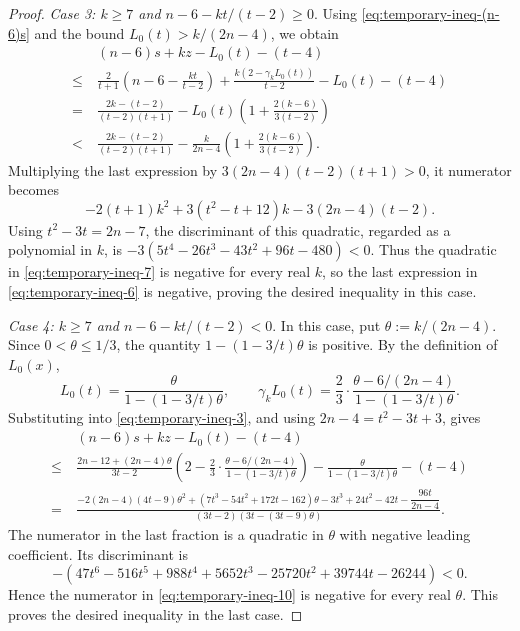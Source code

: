 \documentclass[10pt,a4paper]{amsart}
\begin{document}
\begin{proof}
\smallskip
\noindent\emph{Case 3: $k\geq 7$ and $n-6-kt/(t-2)\geq 0$}.
Using \eqref{eq:temporary-ineq-(n-6)s} and the bound $L_0(t)>k/(2n-4)$, we obtain
\begin{align}\label{eq:temporary-ineq-6}
& ~ (n-6)s + kz - L_0(t) - (t - 4) \nonumber \\
\leq & ~\frac{2}{t+1} \left(n-6-\frac{kt}{t-2}\right) + \frac{k(2 - \gamma_k L_0(t))}{t - 2} - L_0(t) - (t - 4) \nonumber \\
= & ~ \frac{2k-(t-2)}{(t-2)(t+1)} - L_0(t)\left(1 + \frac{2(k-6)}{3(t-2)}\right) \nonumber \\
< & ~ \frac{2k-(t-2)}{(t-2)(t+1)} - \frac{k}{2n-4}
\left(1 + \frac{2(k-6)}{3(t-2)}\right).
\end{align}
Multiplying the last expression by $3(2n-4)(t-2)(t+1) > 0$, it numerator becomes
\begin{equation}\label{eq:temporary-ineq-7}
 -2(t+1)k^2+3(t^2-t+12)k-3(2n-4)(t-2).
\end{equation}
Using $t^2-3t=2n-7$, the discriminant of this quadratic, regarded as a polynomial in $k$, 
is $-3(5t^4 - 26t^3 - 43t^2 + 96t - 480) < 0$. Thus the quadratic in \eqref{eq:temporary-ineq-7} 
is negative for every real $k$, so the last expression in \eqref{eq:temporary-ineq-6} is negative, 
proving the desired inequality in this case.

\smallskip
\noindent\emph{Case 4: $k\geq 7$ and $n-6-kt/(t-2) < 0$}.
In this case, put $\theta := k/(2n-4)$. Since $0<\theta\leq 1/3$, the quantity
$1-(1-3/t)\theta$ is positive. By the definition of $L_0(x)$,
\[
L_0(t) = \frac{\theta}{1-(1-3/t)\theta}, \qquad
\gamma_k L_0(t) = \frac{2}{3}\cdot\frac{\theta - 6/(2n-4)}{1 - (1 - 3/t)\theta}.
\]
Substituting into \eqref{eq:temporary-ineq-3}, and using
$2n - 4 = t^2 - 3t + 3$, gives
\begin{align}\label{eq:temporary-ineq-10}
& ~ (n-6)s + kz - L_0(t) - (t - 4) \nonumber \\
\leq & ~ \frac{2n-12+(2n-4)\theta}{3t-2}
\left(2 - \frac{2}{3}\cdot\frac{\theta - 6/(2n-4)}{1 - (1 - 3/t)\theta}\right) - \frac{\theta}{1-(1-3/t)\theta} - (t - 4) \nonumber \\
= & ~\frac{-2(2n-4)(4t-9) \theta^2 + (7t^3 - 54t^2 + 172t - 162) \theta - 3t^3 + 24t^2 - 42t 
- \dfrac{96t}{2n-4}}{(3t-2) (3t - (3t - 9)\theta)}.
\end{align}
The numerator in the last fraction is a quadratic in $\theta$ with
negative leading coefficient. Its discriminant is
\[
-(47t^6 - 516t^5 + 988t^4 + 5652t^3 - 25720t^2 + 39744t - 26244) < 0.
\]
Hence the numerator in \eqref{eq:temporary-ineq-10} is negative for every real $\theta$. 
This proves the desired inequality in the last case.
\end{proof}
\end{document}
